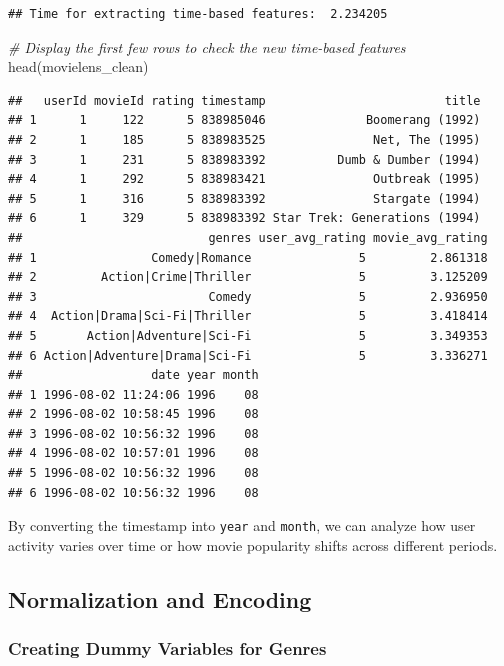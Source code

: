 \documentclass[
]{article}
\newenvironment{Shaded}{}{}
\newcommand{\CommentTok}[1]{\textcolor[rgb]{0.38,0.63,0.69}{\textit{#1}}}
\newcommand{\FunctionTok}[1]{\textcolor[rgb]{0.02,0.16,0.49}{#1}}
\newcommand{\NormalTok}[1]{#1}
\begin{document}
\begin{verbatim}
## Time for extracting time-based features:  2.234205
\end{verbatim}

\begin{Shaded}
\begin{Highlighting}[]
\CommentTok{\# Display the first few rows to check the new time{-}based features}
\FunctionTok{head}\NormalTok{(movielens\_clean)}
\end{Highlighting}
\end{Shaded}

\begin{verbatim}
##   userId movieId rating timestamp                         title
## 1      1     122      5 838985046              Boomerang (1992)
## 2      1     185      5 838983525               Net, The (1995)
## 3      1     231      5 838983392          Dumb & Dumber (1994)
## 4      1     292      5 838983421               Outbreak (1995)
## 5      1     316      5 838983392               Stargate (1994)
## 6      1     329      5 838983392 Star Trek: Generations (1994)
##                          genres user_avg_rating movie_avg_rating
## 1                Comedy|Romance               5         2.861318
## 2         Action|Crime|Thriller               5         3.125209
## 3                        Comedy               5         2.936950
## 4  Action|Drama|Sci-Fi|Thriller               5         3.418414
## 5       Action|Adventure|Sci-Fi               5         3.349353
## 6 Action|Adventure|Drama|Sci-Fi               5         3.336271
##                  date year month
## 1 1996-08-02 11:24:06 1996    08
## 2 1996-08-02 10:58:45 1996    08
## 3 1996-08-02 10:56:32 1996    08
## 4 1996-08-02 10:57:01 1996    08
## 5 1996-08-02 10:56:32 1996    08
## 6 1996-08-02 10:56:32 1996    08
\end{verbatim}

By converting the timestamp into \texttt{year} and \texttt{month}, we
can analyze how user activity varies over time or how movie popularity
shifts across different periods.

\subsection{Normalization and
Encoding}\label{normalization-and-encoding}

\subsubsection{Creating Dummy Variables for
Genres}\label{creating-dummy-variables-for-genres}
\end{document}
